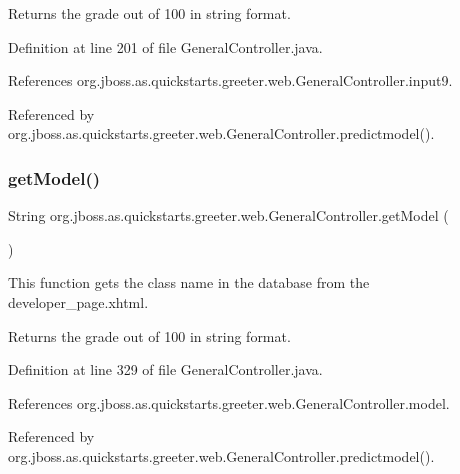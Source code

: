 \begin{DoxyReturn}{Returns}
the grade out of 100 in string format. 
\end{DoxyReturn}


Definition at line 201 of file General\+Controller.\+java.



References org.\+jboss.\+as.\+quickstarts.\+greeter.\+web.\+General\+Controller.\+input9.



Referenced by org.\+jboss.\+as.\+quickstarts.\+greeter.\+web.\+General\+Controller.\+predictmodel().

\mbox{\label{classorg_1_1jboss_1_1as_1_1quickstarts_1_1greeter_1_1web_1_1_general_controller_af4f5236b56800bd56d3346ad7032aed5}} 
\subsubsection{\texorpdfstring{get\+Model()}{getModel()}}
{\footnotesize\ttfamily String org.\+jboss.\+as.\+quickstarts.\+greeter.\+web.\+General\+Controller.\+get\+Model (\begin{DoxyParamCaption}{ }\end{DoxyParamCaption})}



This function gets the class name in the database from the developer\+\_\+page.\+xhtml. 

\begin{DoxyReturn}{Returns}
the grade out of 100 in string format. 
\end{DoxyReturn}


Definition at line 329 of file General\+Controller.\+java.



References org.\+jboss.\+as.\+quickstarts.\+greeter.\+web.\+General\+Controller.\+model.



Referenced by org.\+jboss.\+as.\+quickstarts.\+greeter.\+web.\+General\+Controller.\+predictmodel().

